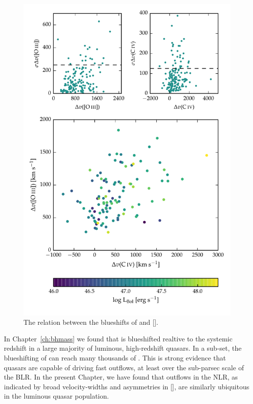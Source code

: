 \begin{figure}
    \includegraphics[width=\columnwidth]{figures/chapter04/civ_blueshift_oiii_blueshift.pdf} 
    \caption[{The relation between the blueshifts of  and [].}]{The relation between the blueshifts of  and [].}     
    \label{fig:oiii_civ_blueshifts}
\end{figure}

In Chapter~\ref{ch:bhmass} we found that  is blueshifted realtive to the systemic redshift in a large majority of luminous, high-redshift quasars. 
In a sub-set, the blueshifting of  can reach many thousands of \kms. 
This is strong evidence that quasars are capable of driving fast outflows, at least over the sub-parsec scale of the BLR. 
In the present Chapter, we have found that outflows in the NLR, as indicated by broad velocity-widths and asymmetries in [], are similarly ubiquitous in the luminous quasar population. 

